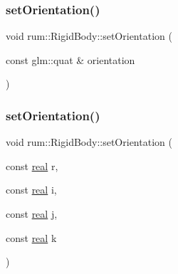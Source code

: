 \mbox{\label{classrum_1_1_rigid_body_a2f4565f3884f4870403a2f6000860a81}} 
\subsubsection{\texorpdfstring{set\+Orientation()}{setOrientation()}\hspace{0.1cm}{\footnotesize\ttfamily [1/2]}}
{\footnotesize\ttfamily void rum\+::\+Rigid\+Body\+::set\+Orientation (\begin{DoxyParamCaption}\item[{const glm\+::quat \&}]{orientation }\end{DoxyParamCaption})}

\mbox{\label{classrum_1_1_rigid_body_a10978d0759ab1cbe0e63a3143d4141b8}} 
\subsubsection{\texorpdfstring{set\+Orientation()}{setOrientation()}\hspace{0.1cm}{\footnotesize\ttfamily [2/2]}}
{\footnotesize\ttfamily void rum\+::\+Rigid\+Body\+::set\+Orientation (\begin{DoxyParamCaption}\item[{const \hyperlink{namespacerum_a7e8cca23573d5eaead0f138cbaa4862c}{real}}]{r,  }\item[{const \hyperlink{namespacerum_a7e8cca23573d5eaead0f138cbaa4862c}{real}}]{i,  }\item[{const \hyperlink{namespacerum_a7e8cca23573d5eaead0f138cbaa4862c}{real}}]{j,  }\item[{const \hyperlink{namespacerum_a7e8cca23573d5eaead0f138cbaa4862c}{real}}]{k }\end{DoxyParamCaption})}

\mbox{\label{classrum_1_1_rigid_body_a7511dfe4f717b8217ae38ced29116a21}} 
